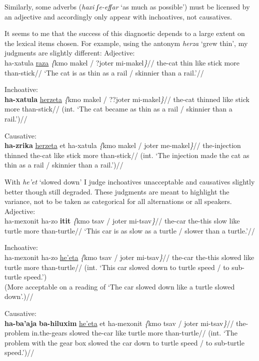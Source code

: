 Similarly, some adverbs (\emph{haxi ʃe-efʃar} `as much as possible') must be licensed by an adjective and accordingly only appear with inchoatives, not causatives.

It seems to me that the success of this diagnostic depends to a large extent on the lexical items chosen. For example, using the antonym \emph{herza} `grew thin', my judgments are slightly different:
\pex
  \a Adjective:\\ \begingl
    \gla ha-xatula \underline{raza} \emph{\{}kmo makel / ?joter mi-makel\emph{\}}//
    \glb the-cat thin like stick {} more than-stick//
    \glft `The cat is as thin as a rail / skinnier than a rail.'//
  \endgl
  
  \a Inchoative:\\ \begingl
    \gla{}\textbf{ha-xatula} \underline{herzeta} \emph{\{}kmo makel / ??joter mi-makel\emph{\}}//
    \glb the-cat thinned like stick {} more than-stick//
    \glft (int. `The cat became as thin as a rail / skinnier than a rail.')//
  \endgl

  \a Causative:\\ \begingl
    \gla {}\textbf{ha-zrika} \underline{herzeta} et ha-xatula \emph{\{}kmo makel / joter me-makel\emph{\}}//
    \glb the-injection thinned  the-cat like stick {} more than-stick//
    \glft (int. `The injection made the cat as thin as a rail / skinnier than a rail.')//
  \endgl
\xe

With \emph{he'et} `slowed down' I judge inchoatives unacceptable and causatives slightly better though still degraded. These judgments are meant to highlight the variance, not to be taken as categorical for all alternations or all speakers.
\pex
	\a Adjective:\\ \begingl
		\gla ha-mexonit ha-zo \textbf{itit} \emph{\{}kmo tsav / joter mi-tsav\emph{\}}//
		\glb the-car the-this slow like turtle {} more than-turtle//
		\glft `This car is as slow as a turtle / slower than a turtle.'//
	\endgl

	\a Inchoative:\\ \begingl
		\gla\ljudge{*}ha-mexonit ha-zo \underline{he'eta} \emph{\{}kmo tsav / joter mi-tsav\emph{\}}//
		\glb the-car the-this slowed like turtle {} more than-turtle//
		\glft (int. `This car slowed down to turtle speed / to sub-turtle speed.')\\
			(More acceptable on a reading of `The car slowed down like a turtle slowed down'.)//
	\endgl

	\a Causative:\\ \begingl
		\gla{}\textbf{ha-ba'aja} \textbf{ba-hiluxim} \underline{he'eta} et ha-mexonit \emph{\{}kmo tsav / joter mi-tsav\emph{\}}//
		\glb the-problem in.the-gears slowed  the-car like turtle {} more than-turtle//
		\glft (int. `The problem with the gear box slowed the car down to turtle speed / to sub-turtle speed.')//
	\endgl
\xe

